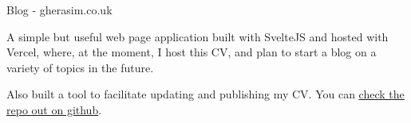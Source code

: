 \cventry
    {Blog - gherasim.co.uk} %
    {} %
    {} %
    {} %
    {\begin{cvitems}
        \item{A simple but useful web page application built with SvelteJS and hosted with Vercel, where, at the moment, I host this CV, and plan to start a blog on a variety of topics in the future.}
        \item{Also built a tool to facilitate updating and publishing my CV. You can \href{https://github.com/bogdan23a/cv}{check the repo out on github}.}
    \end{cvitems}}